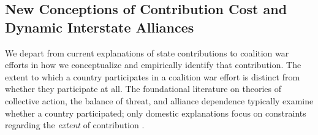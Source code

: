 \documentclass[12pt,letterpaper]{article}
\begin{document}
	\subsection{New Conceptions of Contribution Cost and Dynamic Interstate Alliances}
		We depart from current explanations of state contributions to coalition war efforts in how we conceptualize and empirically identify that contribution. The extent to which a country participates in a coalition war effort is distinct from whether they participate at all. The foundational literature on theories of collective action, the balance of threat, and alliance dependence typically examine whether a country participated; only domestic explanations focus on constraints regarding the \textit{extent} of contribution \citep{bennett_burdensharingpersiangulf_1994, bogers_missionafghanistanwho_2013, mello_pathscoalitiondefection_2020}.
\end{document}
